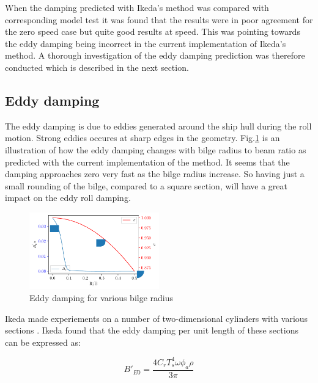     When the damping predicted with Ikeda's method was compared with
corresponding model test it was found that the results were in poor
agreement for the zero speed case but quite good results at speed. This
was pointing towards the eddy damping being incorrect in the current
implementation of Ikeda's method. A thorough investigation of the eddy
damping prediction was therefore conducted which is described in the
next section.

\quad     \subsection*{Eddy damping}\label{eddy-damping}

\quad The eddy damping is due to eddies generated around the ship hull during
the roll motion. Strong eddies occures at sharp edges in the geometry.
Fig.\ref{fig:eddy_sigma} is an illustration of how the eddy
damping changes with bilge radius to beam ratio as predicted with the
current implementation of the method. It seems that the damping
approaches zero very fast as the bilge radius increase. So having just a
small rounding of the bilge, compared to a square section, will have a
great impact on the eddy roll damping.

\quad     

\quad     \begin{figure}[H]
        \begin{center}\includegraphics[width = 0.5\textwidth]{figures/eddy_sigma.pdf}\end{center}
        \vspace{-1cm}
        \caption{Eddy damping for various bilge radius}
        \label{fig:eddy_sigma}
    \end{figure}
    
    Ikeda made experiements on a number of two-dimensional cylinders with
various sections \citep{7505983/4AFVVGNT}. Ikeda found that the eddy
damping per unit length of these sections can be expressed as: 
 
            
    
    \begin{equation}
B'_{E0} = \frac{4 C_{r} T_{s}^{4} \omega \phi_{a} \rho}{3 \pi}
\label{eq:eddy_section}
\end{equation}

